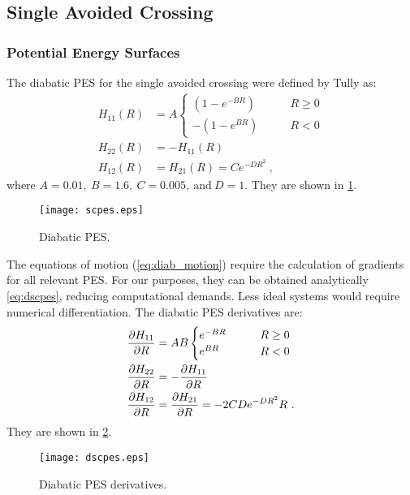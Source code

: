 \subsection{Single Avoided Crossing}\label{s:sac}
%
\subsubsection{Potential Energy Surfaces}
%
The diabatic PES for the single avoided crossing were defined by Tully \cite{tully} as:
\begin{subequations}\label{eq:scpes}
\begin{align}
H_{11}(R) &=
A\begin{cases}
\left(1 - e^{-B R}\right) &\qquad R \geq 0\\
-\left(1 - e^{B R}\right) &\qquad R<0
\end{cases}\\
H_{22}(R) &= -H_{11}(R)\\
H_{12}(R) &= H_{21}(R) = C e^{-D R^{2}}~,
\end{align}
\end{subequations}
where $ A = 0.01,~B = 1.6,~C = 0.005,~\text{and}~D = 1$. They are shown in \cref{f:pessc}.

\begin{figure}
\centering
\texttt{[image: scpes.eps]}
\caption[Single avoided crossing: diabatic PES.]{Diabatic PES.}
\label{f:pessc}
\end{figure}

The equations of motion (\cref{eq:diab_motion}) require the calculation of 
gradients for all relevant PES. For our purposes, they can be obtained 
analytically \cref{eq:dscpes}, reducing computational demands. Less ideal 
systems would require numerical differentiation. The diabatic PES derivatives 
are:
\begin{subequations}\label{eq:dscpes}
\begin{align}
\frac{\partial H_{11}}{\partial R} & = 
A B \begin{cases}
e^{-B R} &\qquad R \geq 0\\
e^{B R} &\qquad R < 0
\end{cases}
\\
\frac{\partial H_{22}}{\partial R} &= -\frac{\partial H_{11}}{\partial R}\\
\frac{\partial H_{12}}{\partial R} &= \frac{\partial H_{21}}{\partial R} = -2 C D e^{-D R^{2}} R~.
\end{align}
\end{subequations}
They are shown in \cref{f:dpessc}.

\begin{figure}
\centering
\texttt{[image: dscpes.eps]}
\caption[Single avoided crossing: diabatic PES derivatives.]{Diabatic PES derivatives.}
\label{f:dpessc}
\end{figure}


